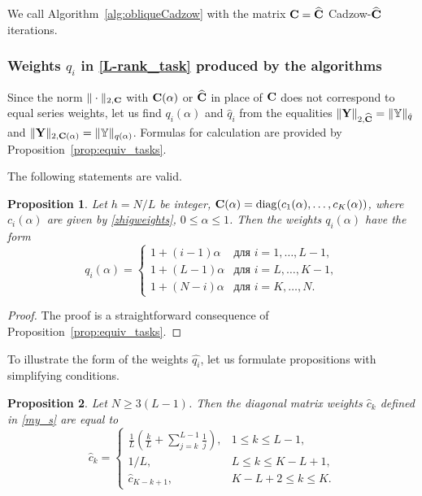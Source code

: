 \documentclass[sii]{ipart}
\newtheorem{proposition}{Proposition}
\begin{document}


We call Algorithm~\ref{alg:obliqueCadzow} with the matrix $\mathbf{C}=\widehat{\mathbf{C}}$ Cadzow-$\widehat{\mathbf{C}}$ iterations.

\subsubsection{Weights $q_i$ in \eqref{L-rank_task} produced by the algorithms}
Since the norm $\|\cdot\|_{2, \mathbf{C}}$ with $\mathbf{C}(\alpha)$ or $\widehat{\mathbf{C}}$ in place of $\mathbf{C}$ does not correspond to equal series weights,
let us find $q_i(\alpha)$ and $\hat{q}_i$ from the equalities
$\|\mathbf{Y}\|_{2,\widehat{\mathbf{C}}}=\|\mathbb{Y}\|_{\hat{q}}$ and $\|\mathbf{Y}\|_{2,\mathbf{C}(\alpha)}=\|\mathbb{Y}\|_{q(\alpha)}$.
Formulas for calculation are provided by Proposition~\ref{prop:equiv_tasks}.

The following statements are valid.

\begin{proposition}\label{prop:zhigconseq}
	Let $h = N/L$ be integer, $\mathbf{C}(\alpha) = \mathop{\mathrm{diag}}(c_1(\alpha), \ldots, c_K(\alpha))$, where $c_i(\alpha)$ are given by \eqref{zhigweights}, $0 \le \alpha \le 1$. Then the weights $q_i(\alpha)$ have the form
	\begin{equation*}
	q_i (\alpha) = \begin{cases}
	1 + (i - 1) \alpha & \text{для $i = 1, \ldots, L-1,$}\\
	1 + (L - 1) \alpha & \text{для $i = L, \ldots, K-1,$}\\
	1 + (N - i) \alpha & \text{для $i = K, \ldots, N.$}
	\end{cases}
	\end{equation*}
\end{proposition}
\begin{proof}
	The proof is a straightforward consequence of Proposition~\ref{prop:equiv_tasks}.
\end{proof}

To illustrate the form of the weights $\hat{q_i}$, let us formulate propositions with simplifying conditions.
\begin{proposition} \label{myweightstat}
	Let $N \ge 3(L-1)$. Then the diagonal matrix weights $\hat c_k$ defined in \eqref{my_s} are equal to
	\begin{equation*}
	\hat c_k = \begin{cases}
	\frac{1}{L}\left(\frac{k}{L} + \sum_{j=k}^{L-1} \frac{1}{j} \right),& 1 \le k \le L-1, \\
	1/L, & L \le k \le K - L + 1,\\
	\hat c_{K - k + 1}, & K - L + 2 \le k \le K.
 	          \end{cases}
	\end{equation*}
\end{proposition}
\end{document}
